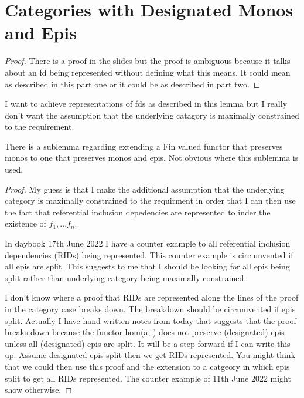 \documentclass[12pt,a4paper]{article}
\theoremstyle{remark}
\begin{document}
\section{Categories with Designated Monos and Epis}
\newcommand{\pause}{}



\begin{lemma}
\representationLemmaPartOne
\end{lemma}
\begin{proof}
There is a proof in the slides but the proof is ambiguous because it talks about an fd being represented without defining what this means. It could mean as described in this part one or it could be as described in part two. 
\end{proof}

I want to achieve representations of fds as described in this lemma but I really don't want the assumption that the underlying catagory is maximally constrained to the requirement.

There is a sublemma regarding extending a Fin valued functor that preserves monos to one that preserves monos and epis. Not obvious where this sublemma is used.   
\begin{lemma}
\representationLemmaPartTwo
\end{lemma}
\begin{proof}
My guess is that I make the additional assumption that the underlying category is maximally constrained to the requirment in order that I can then use the fact that referential inclusion depedencies are represented to inder the existence of $f_1, ... f_n$.

In daybook 17th June 2022 I have a counter example to all referential inclusion dependencies (RIDs) being represented. This counter example is circumvented if all epis are split.
This suggests to me that I should be looking for all epis being split rather than underlying category being maximally constrained.

I don't know where a proof that RIDs are represented along the lines of the proof in the category case breaks down. The breakdown should be circumvented if epis split. 
Actually I have hand written notes from today that suggests that the proof breaks down because the functor hom(a,-) does not preserve (designated) epis unless all (designated) epis are split. It will be a step forward if I can write this up. Assume designated epis split then we get RIDs represented. You might think that we could then use this proof and the extension to a catgeory in which epis split to get all RIDs represented. The counter example of 11th June 2022 might show otherwise.  
\end{proof}
\end{document}
